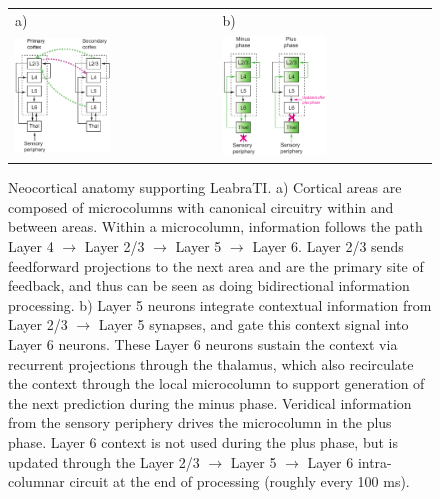 \documentclass[10pt,letterpaper]{article}
\numberwithin{equation}{section}
\begin{document}
\begin{figure}[h]
\centering
\begin{tabular}{ll}
a) & b) \\                
\includegraphics[width=0.49\textwidth]{microcircuit_horiz} & 
\includegraphics[width=0.51\textwidth]{microcircuit_minus_plus} \\
\end{tabular}
\caption{\small{Neocortical anatomy supporting LeabraTI. a) Cortical areas are composed of microcolumns with canonical circuitry within and between areas. Within a microcolumn, information follows the path Layer 4 $\rightarrow$ Layer 2/3 $\rightarrow$ Layer 5 $\rightarrow$ Layer 6. Layer 2/3 sends feedforward projections to the next area and are the primary site of feedback, and thus can be seen as doing bidirectional information processing. b) Layer 5 neurons integrate contextual information from Layer 2/3 $\rightarrow$ Layer 5 synapses, and gate this context signal into Layer 6 neurons. These Layer 6 neurons sustain the context via recurrent projections through the thalamus, which also recirculate the context through the local microcolumn to support generation of the next prediction during the minus phase. Veridical information from the sensory periphery drives the microcolumn in the plus phase. Layer 6 context is not used during the plus phase, but is updated through the Layer 2/3 $\rightarrow$ Layer 5 $\rightarrow$ Layer 6 intra-columnar circuit at the end of processing (roughly every 100 ms).}}
\label{fig:leabrati}
\end{figure}
\end{document}
